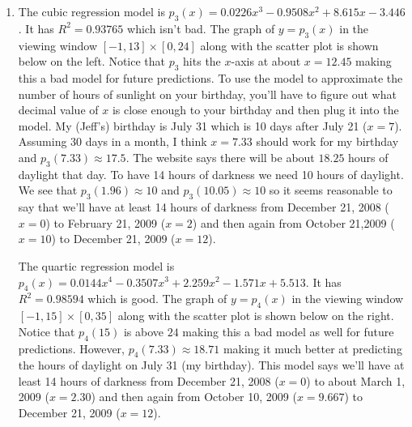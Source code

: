 \documentclass{ximera}
\begin{document}
\begin{enumerate}
\setcounter{enumi}{\value{HW}}


\item The cubic regression model is $p_{3}(x) = 0.0226x^{3} - 0.9508x^{2} + 8.615x - 3.446$.  It has $R^{2} = 0.93765$ which isn't bad.  The graph of $y = p_{3}(x)$ in the viewing window $[-1,13] \times [0, 24]$ along with the scatter plot is shown below on the left.  Notice that $p_{3}$ hits the $x$-axis at about $x = 12.45$ making this a bad model for future predictions.  To use the model to approximate the number of hours of sunlight on your birthday, you'll have to figure out what decimal value of $x$ is close enough to your birthday and then plug it into the model.  My (Jeff's) birthday is July 31 which is 10 days after July 21 ($x = 7$).  Assuming 30 days in a month, I think $x = 7.33$ should work for my birthday and $p_{3}(7.33) \approx 17.5$.  The website says there will be about $18.25$ hours of daylight that day.  To have 14 hours of darkness we need 10 hours of daylight.  We see that $p_{3}(1.96) \approx 10$ and $p_{3}(10.05) \approx 10$ so it seems reasonable to say that we'll have at least 14 hours of darkness from December 21, 2008 ($x = 0$) to February 21, 2009 ($x = 2$) and then again from October 21,2009 ($x = 10$) to December 21, 2009 ($x = 12$).

\smallskip

The quartic regression model is $p_{4}(x) = 0.0144x^{4} - 0.3507x^{3} + 2.259x^{2} - 1.571x + 5.513$.  It has $R^{2} = 0.98594$ which is good.  The graph of $y = p_{4}(x)$ in the viewing window $[-1, 15] \times [0, 35]$ along with the scatter plot is shown below on the right.  Notice that $p_{4}(15)$ is above $24$ making this a bad model as well for future predictions.  However, $p_{4}(7.33) \approx 18.71$ making it much better at predicting the hours of daylight on July 31 (my birthday).  This model says we'll have at least 14 hours of darkness from December 21, 2008 ($x = 0$) to about March 1, 2009 ($x = 2.30$) and then again from October 10, 2009 ($x = 9.667$) to December 21, 2009 ($x = 12$).

\begin{center}

\begin{tabular}{cc}



\end{tabular}
\end{center}
\end{enumerate}
\end{document}

